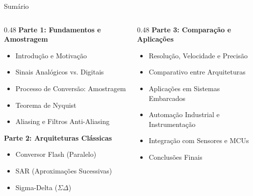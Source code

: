 \documentclass{beamer}
\begin{document}
\begin{frame}{Sumário}
    \small %
    \begin{columns}[T]
        \begin{column}{0.48\textwidth} %
            \textbf{Parte 1: Fundamentos e Amostragem} \hfill \textcolor{gray}{}
            \begin{itemize}
                \setlength{\itemsep}{0pt}      %
                \setlength{\parskip}{0pt}
                \item Introdução e Motivação
                \item Sinais Analógicos vs. Digitais
                \item Processo de Conversão: Amostragem
                \item Teorema de Nyquist
                \item Aliasing e Filtros Anti-Aliasing
            \end{itemize}
            
            \vspace{0.1cm} %
            \textbf{Parte 2: Arquiteturas Clássicas} \hfill \textcolor{gray}{}
            \begin{itemize}
                \setlength{\itemsep}{0pt}
                \setlength{\parskip}{0pt}
                \item Conversor Flash (Paralelo)
                \item SAR (Aproximações Sucessivas) %
                \item Sigma-Delta ($\Sigma\Delta$)
            \end{itemize}
        \end{column}
        
        \begin{column}{0.48\textwidth} %
            \textbf{Parte 3: Comparação e Aplicações} \hfill \textcolor{gray}{}
            \begin{itemize}
                \setlength{\itemsep}{0pt}
                \setlength{\parskip}{0pt}
                \item Resolução, Velocidade e Precisão
                \item Comparativo entre Arquiteturas
                \item Aplicações em Sistemas Embarcados
                \item Automação Industrial e Instrumentação
                \item Integração com Sensores e MCUs %
                \item Conclusões Finais
            \end{itemize}
        \end{column}
    \end{columns}
\end{frame}
\end{document}
